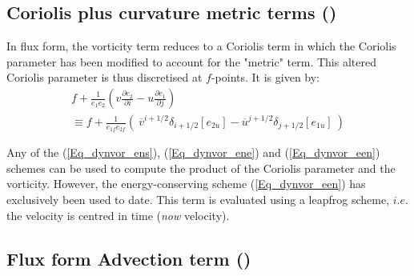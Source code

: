 \subsection   [Coriolis plus curvature metric terms (\textit{dynvor}) ]
			{Coriolis plus curvature metric terms () }
\label{DYN_cor_flux}

In flux form, the vorticity term reduces to a Coriolis term in which the Coriolis 
parameter has been modified to account for the "metric" term. This altered 
Coriolis parameter is thus discretised at $f$-points. It is given by: 
\begin{multline} \label{Eq_dyncor_metric}
f+\frac{1}{e_1 e_2 }\left( {v\frac{\partial e_2 }{\partial i}  -  u\frac{\partial e_1 }{\partial j}} \right)  \\
   \equiv   f + \frac{1}{e_{1f} e_{2f} } \left( { \ \overline v ^{i+1/2}\delta _{i+1/2} \left[ {e_{2u} } \right]  
                                                                 -  \overline u ^{j+1/2}\delta _{j+1/2} \left[ {e_{1u} } \right]  }  \ \right)
\end{multline} 

Any of the (\ref{Eq_dynvor_ens}), (\ref{Eq_dynvor_ene}) and (\ref{Eq_dynvor_een}) 
schemes can be used to compute the product of the Coriolis parameter and the 
vorticity. However, the energy-conserving scheme  (\ref{Eq_dynvor_een}) has 
exclusively been used to date. This term is evaluated using a leapfrog scheme, 
$i.e.$ the velocity is centred in time (\textit{now} velocity).

\subsection   [Flux form Advection term (\textit{dynadv}) ]
			{Flux form Advection term () }
\label{DYN_adv_flux}

